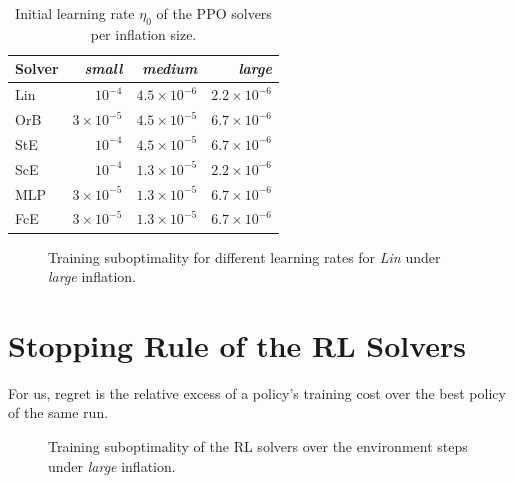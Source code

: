 \begin{table}[htbp]
  \centering
  \caption{Initial learning rate $\eta_0$ of the PPO solvers per inflation size.}
  \label{tab:app-rl-learning-rates}
  \begin{tabular}{@{}lrrr@{}}
    \toprule
    Solver & \emph{small} & \emph{medium} & \emph{large} \\ 
    \midrule
    Lin & $10^{-4}$ & $4.5 \times 10^{-6}$ & $2.2 \times 10^{-6}$ \\
    OrB & $3 \times 10^{-5}$ & $4.5 \times 10^{-5}$ & $6.7 \times 10^{-6}$ \\
    StE & $10^{-4}$ & $4.5 \times 10^{-5}$ & $6.7 \times 10^{-6}$ \\
    ScE & $10^{-4}$ & $1.3 \times 10^{-5}$ & $2.2 \times 10^{-6}$ \\
    MLP & $3 \times 10^{-5}$ & $1.3 \times 10^{-5}$ & $6.7 \times 10^{-6}$ \\
    FcE & $3 \times 10^{-5}$ & $1.3 \times 10^{-5}$ & $6.7 \times 10^{-6}$ \\
    \bottomrule
  \end{tabular}
\end{table}

\begin{figure}[htbp]
  \centering
  \caption{Training suboptimality for different learning rates for \emph{Lin} under \emph{large} inflation.}
  \label{fig:app-rl-learning-rate-ppo-linear-large}
\end{figure}

\section{Stopping Rule of the RL Solvers}
\label{sec:app-rl-convergence}

For us, regret is the relative excess of a policy's training cost over the best policy of
the same run.

\begin{table}[htbp]
  \centering
  \caption{Stopping-rule settings with the lowest median regret.}
  \label{tab:app-rl-convergence-grid}
  
\end{table}

\begin{table}[htbp]
  \centering
  \caption{Position of the best policy of the RL runs, as a share of the step budget, and the regret
    of the policy after $75\,\%$ of the budget, of the final policy, and of the policy with the best
    $\bar{g}_j$.}
  \label{tab:app-rl-convergence-cells}
  
\end{table}

\begin{figure}[htbp]
  \centering
  \caption{Training suboptimality of the RL solvers over the environment steps under \emph{large}
    inflation.}
  \label{fig:app-rl-convergence-large}
\end{figure}
